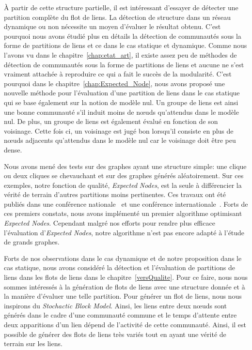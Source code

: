 \bigskip

\`A partir de cette structure partielle, il est intéressant d'essayer de détecter une partition complète du flot de liens.
La détection de structure dans un réseau dynamique ou non nécessite un moyen d'évaluer le résultat obtenu.
C'est pourquoi nous avons étudié plus en détails la détection de communautés sous la forme de partitions de liens et ce dans le cas statique et dynamique.
Comme nous l'avons vu dans le chapitre~\ref{chap:etat_art}, il existe assez peu de méthodes de détection de communautés sous la forme de partitions de liens et aucune ne s'est vraiment attachée à reproduire ce qui a fait le succès de la modularité.
C'est pourquoi dans le chapitre~\ref{chap:Expected_Node}, nous avons proposé une nouvelle méthode pour l'évaluation d'une partition de liens dans le cas statique qui se base également sur la notion de modèle nul.
Un groupe de liens est ainsi une bonne communauté s'il induit moins de n\oe{}uds qu'attendus dans le modèle nul.
De plus, un groupe de liens est également évalué en fonction de son voisinage.
Cette fois ci, un voisinage est jugé bon lorsqu'il consiste en plus de n\oe{}uds adjacents qu'attendus dans le modèle nul car le voisinage doit être peu dense.

Nous avons mené des tests sur des graphes ayant une structure simple: une clique ou deux cliques se chevauchant et sur des graphes générés aléatoirement.
Sur ces exemples, notre fonction de qualité, \emph{Expected} \emph{Nodes}, est la seule à différencier la vérité de terrain d'autres partitions moins pertinentes.
Ces travaux ont été publiés dans une conférence nationale~\cite{Gaumont2014} et une conférence internationale~\cite{Gaumont2015}.
Forts de ces premiers constats, nous avons implémenté un premier algorithme optimisant \emph{Expected Nodes}.
Cependant malgré nos efforts pour rendre plus efficace l'évaluation d'\emph{Expected Nodes}, notre algorithme n'est pas encore adapté à l'étude de grands graphes.

\bigskip

Forts de nos observations dans le cas dynamique et de notre proposition dans le cas statique, nous avons considéré la détection et l'évaluation de partitions de liens dans les flots de liens dans le chapitre~\ref{versQualite}.
Pour ce faire, nous nous sommes intéressés à la génération de flots de liens avec une structure donnée et à la manière d'évaluer une telle partition.
Pour générer un flot de liens, nous nous inspirons du \emph{Stochactic Block Model}.
Ainsi, les liens entre deux n\oe{}uds sont générés dans le cadre d'une communauté commune et le temps d'attente entre deux apparitions d'un lien dépend de l'activité de cette communauté.
Ainsi, il est possible de générer des flots de liens très variés tout en ayant une vérité de terrain sur les liens.

